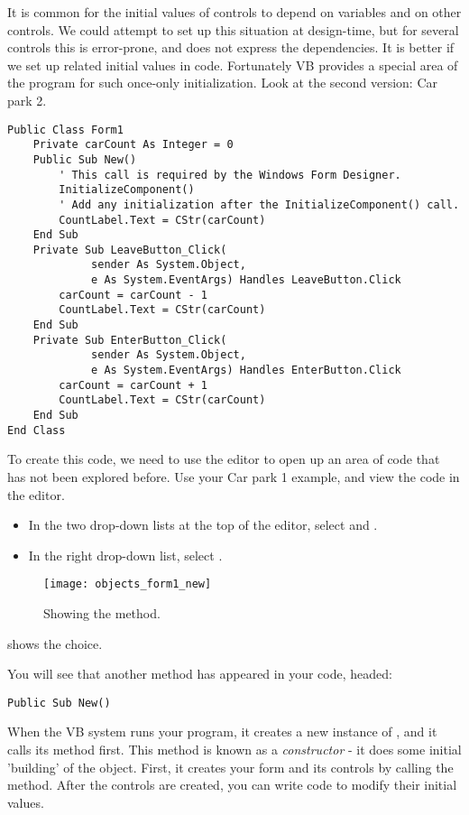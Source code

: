 		It is common for the initial values of controls to depend on variables and on other controls. We could attempt to set up this situation at design-time, but for several controls this is error-prone, and does not express the dependencies. It is better if we set up related initial values in code. Fortunately VB provides a special area of the program for such once-only initialization. Look at the second version: Car park 2.
		\begin{lstlisting}
Public Class Form1
	Private carCount As Integer = 0
	Public Sub New()
		' This call is required by the Windows Form Designer.
		InitializeComponent()
		' Add any initialization after the InitializeComponent() call.
		CountLabel.Text = CStr(carCount)
	End Sub
	Private Sub LeaveButton_Click(
			 sender As System.Object,
			 e As System.EventArgs) Handles LeaveButton.Click
		carCount = carCount - 1
		CountLabel.Text = CStr(carCount)
	End Sub
	Private Sub EnterButton_Click(
			 sender As System.Object,
			 e As System.EventArgs) Handles EnterButton.Click
		carCount = carCount + 1
		CountLabel.Text = CStr(carCount)
	End Sub
End Class
		\end{lstlisting}
		To create this code, we need to use the editor to open up an area of code that has not been explored before. Use your Car park 1 example, and view the code in the editor.
		\begin{itemize}
			\item In the two drop-down lists at the top of the editor, select  and .
			\item In the right drop-down list, select .
		\end{itemize}
		\begin{figure}[ht]
			\centering
			\texttt{[image: objects\_form1\_new]}
			\caption{Showing the  method.}
			\label{fig:objects_form1_new}
		\end{figure}

		 shows the choice.
		
		You will see that another method has appeared in your code, headed:
		\begin{lstlisting}
Public Sub New()
		\end{lstlisting}
		When the VB system runs your program, it creates a new instance of , and it calls its  method first. This method is known as a \emph{constructor} - it does some initial 'building' of the object. First, it creates your form and its controls by calling the  method. After the controls are created, you can write code to modify their initial values.
		
